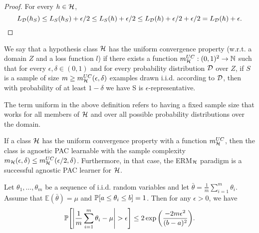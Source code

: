 \documentclass[11pt,a4paper]{article}
\begin{document}
\begin{proof}
For every $h\in\mathcal{H}$,
\begin{equation*}
L_{\mathcal{D}}(h_S)\le L_S(h_S) + \epsilon/2 \le L_S(h) + \epsilon/2 \le L_{\mathcal{D}}(h) + \epsilon/2 + \epsilon/2 = L_{\mathcal{D}}(h) + \epsilon.
\end{equation*}
\end{proof}

\begin{mydef}
We say that a hypothesis class $\mathcal{H}$ has the uniform convergence property (w.r.t. a domain $Z$ and a loss function $l$) if there exists a function $m_{\mathcal{H}}^{UC}:(0,1)^2\rightarrow \mathbb{N}$ such that for every $\epsilon,\delta\in(0,1)$ and for every probability distribution $\mathcal{D}$ over $Z$, if $S$ is a sample of size $m\ge m_{\mathcal{H}}^{UC}(\epsilon,\delta)$ examples drawn i.i.d. according to $\mathcal{D}$, then with probability of at least $1-\delta$ we have S is $\epsilon$-representative.
\end{mydef}

\begin{remark}
The term uniform in the above definition refers to having a fixed sample size that works for all members of $\mathcal{H}$ and over all possible probability distributions over the domain.
\end{remark}

\begin{corollary}
If a class $\mathcal{H}$ has the uniform convergence property with a function $m_{\mathcal{H}}^{UC}$, then the class is agnostic PAC learnable with the sample complexity $m_{\mathcal{H}}(\epsilon,\delta)\le m_{\mathcal{H}}^{UC}(\epsilon/2,\delta)$. Furthermore, in that case, the ERM$_{\mathcal{H}}$ paradigm is a successful agnostic PAC learner for $\mathcal{H}$.
\end{corollary}

\begin{lemma}
Let $\theta_1,\ldots,\theta_m$ be a sequence of i.i.d. random variables and let $\bar{\theta} = \tfrac{1}{m} \sum_{i=1}^m \theta_i$. Assume that $\mathbb{E}(\bar{\theta}) = \mu$ and $\mathbb{P}[a\le \theta_i\le b] = 1$. Then for any $\epsilon>0$, we have
\begin{equation*}
\Prob\Bigg[ \Bigg| \dfrac{1}{m}\sum_{i=1}^m\theta_i - \mu \Bigg|>\epsilon \Bigg] \le 2 \exp{\bigg(\dfrac{-2m\epsilon^2}{(b-a)^2} \bigg)}.
\end{equation*}
\end{lemma}

\end{document}
